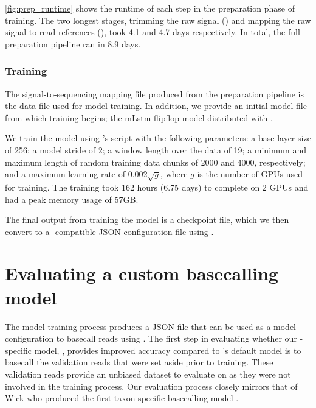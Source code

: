 \autoref{fig:prep_runtime} shows the runtime of each step in the preparation phase of training. The two longest stages, trimming the raw signal () and mapping the raw signal to read-references (), took 4.1 and 4.7 days respectively. In total, the full preparation pipeline ran in 8.9 days. 

\subsubsection{Training}

The signal-to-sequencing mapping file produced from the preparation pipeline is the data file used for model training. In addition, we provide an initial model file from which training begins; the mLstm flipflop model distributed with \taiyaki{}.

We train the model using \taiyaki{}'s  script with the following parameters: a base layer size of 256; a model stride of 2; a window length over the data of 19; a minimum and maximum length of random training data chunks of 2000 and 4000, respectively; and a maximum learning rate of $0.002\sqrt{g}$, where $g$ is the number of GPUs used for training. The training took 162 hours (6.75 days) to complete on 2 GPUs and had a peak memory usage of 57GB. 

The final output from training the model is a checkpoint file, which we then convert to a \guppy{}-compatible JSON configuration file using \taiyaki{}.

\section{Evaluating a custom \ont{} basecalling model}

The model-training process produces a JSON file that can be used as a model configuration to basecall \ont{} reads using \guppy{}. The first step in evaluating whether our \mtb{}-specific model, \tubby{}, provides improved accuracy compared to \guppy{}'s default model is to basecall the validation reads that were set aside prior to training. These validation reads provide an unbiased dataset to evaluate on as they were not involved in the training process. Our evaluation process closely mirrors that of Wick \etal{} who produced the first taxon-specific \ont{} basecalling model \cite{wick2019}.  

